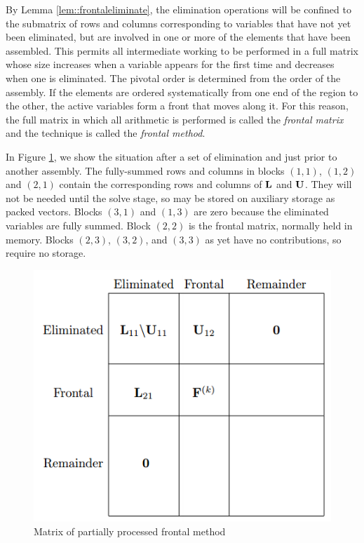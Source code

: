 \begin{defn}
    By Lemma \ref{lem::frontaleliminate}, the elimination 
    operations will be confined to the submatrix of rows and 
    columns corresponding to variables that have not yet been 
    eliminated, but are involved in one or more of the elements 
    that have been assembled. This permits all intermediate
    working to be performed in a full matrix whose size 
    increases when a variable appears for the first time and 
    decreases when one is eliminated. The pivotal order is 
    determined from the order of the assembly. If the elements 
    are ordered systematically from one end of the region to 
    the other, the active variables form a front that moves 
    along it. For this reason, the full matrix in which all 
    arithmetic is performed is called the \textit{frontal 
    matrix} and the technique is called the 
    \textit{frontal method}.
\end{defn}

\begin{exm}
    In Figure \ref{fig::Frontal}, we show the situation after 
    a set of elimination and just prior to another assembly. 
    The fully-summed rows and columns in blocks $(1,1)$, 
    $(1,2)$ and $(2,1)$ contain the corresponding rows and 
    columns of ${\mathbf{L}}$ and ${\mathbf{U}}$. They will not be needed until 
    the solve stage, so may be stored on auxiliary storage as
    packed vectors. Blocks $(3,1)$ and $(1,3)$ are zero 
    because the eliminated variables are fully summed. Block 
    $(2,2)$ is the frontal matrix, normally held in memory. 
    Blocks $(2,3)$, $(3,2)$, and $(3,3)$ as yet have no 
    contributions, so require no storage.
    \begin{figure}[H]
        \includegraphics[width=0.8\linewidth]{png/Frontal.png}
        \caption{Matrix of partially processed frontal method}
        \label{fig::Frontal}
    \end{figure}
\end{exm}


